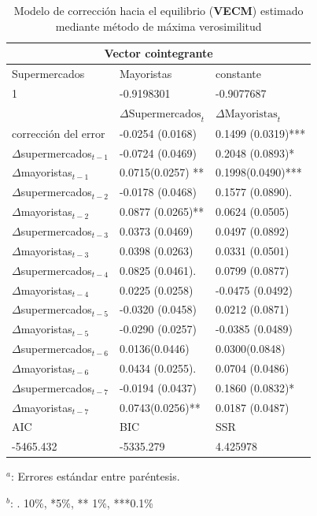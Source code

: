 \documentclass[12pt, twoside]{book}\usepackage[]{graphicx}\usepackage[]{color}
\numberwithin{equation}{section}
\numberwithin{theorem}{section}
\numberwithin{teorema}{section}
\numberwithin{defi}{section}
\numberwithin{prop}{section}
\numberwithin{defi}{section}
\theoremstyle{plain}
\begin{document}
\begin{table}[!htpb]
\centering
\begin{threeparttable}
\caption{Modelo de corrección hacia el equilibrio (\textbf{VECM}) estimado mediante método de máxima verosimilitud \label{vecm_f}}
\begin{tabular}{@{}lll@{}}
\toprule
\multicolumn{3}{c}{Vector cointegrante} \\
\midrule 
Supermercados & Mayoristas & constante \\ 
1             & -0.9198301 & -0.9077687 \\
\midrule
 & $\Delta \text{Supermercados}_{t} $ & $\Delta \text{Mayoristas}_{t}$ \\ 
 \midrule 
 $\text{corrección del error}$ & -0.0254 (0.0168)   &  0.1499 (0.0319)*** \\     
$\Delta$supermercados$_{t-1}$   &   -0.0724 (0.0469) &   0.2048 (0.0893)*  \\   
$\Delta$mayoristas$_{t-1}$  & 0.0715(0.0257) **  &  0.1998(0.0490)*** \\     
$\Delta$supermercados$_{t-2}$  & -0.0178 (0.0468)  &   0.1577 (0.0890).  \\   
$\Delta$mayoristas$_{t-2}$  & 0.0877 (0.0265)**  &  0.0624 (0.0505) \\     
$\Delta$supermercados$_{t-3}$ &  0.0373 (0.0469)  & 0.0497 (0.0892) \\
$\Delta$mayoristas$_{t-3}$  & 0.0398 (0.0263)  &   0.0331 (0.0501)   \\   
$\Delta$supermercados$_{t-4}$   &   0.0825 (0.0461).  &   0.0799 (0.0877) \\     
$\Delta$mayoristas$_{t-4}$  & 0.0225 (0.0258)  &   -0.0475 (0.0492)  \\   
$\Delta$supermercados$_{t-5}$   &  -0.0320 (0.0458)  &  0.0212 (0.0871) \\     
$\Delta$mayoristas$_{t-5}$  & -0.0290 (0.0257)  &  -0.0385 (0.0489)  \\   
$\Delta$supermercados$_{t-6}$   & 0.0136(0.0446)   &  0.0300(0.0848) \\     
$\Delta$mayoristas$_{t-6}$  & 0.0434 (0.0255).  &  0.0704 (0.0486) \\     
$\Delta$supermercados$_{t-7}$   &  -0.0194 (0.0437)  &   0.1860 (0.0832)* \\     
$\Delta$mayoristas$_{t-7}$  & 0.0743(0.0256)**   &  0.0187 (0.0487)  \\   
\midrule 
AIC & BIC & SSR \\ 
\midrule 
-5465.432 & -5335.279 & 4.425978 \\
\bottomrule
\end{tabular}
\begin{tablenotes}
\small 
\item $^{a}$: Errores estándar entre paréntesis. 
\item $^{b}$: . 10\%, *5\%, ** 1\%, ***0.1\%
\end{tablenotes}
\end{threeparttable}
\end{table}
\end{document}
